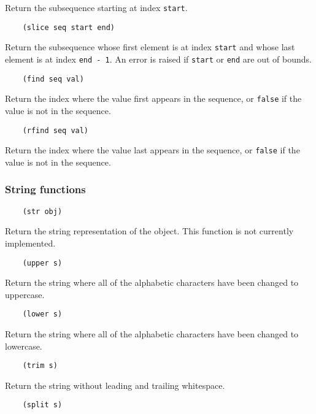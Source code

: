 \documentclass{article}
\newcommand{\inlinecode}{\texttt}
\begin{document}
Return the subsequence starting at index \inlinecode{start}.

\begin{verbatim}
    (slice seq start end)
\end{verbatim}

Return the subsequence whose first element is at index \inlinecode{start} and whose last element is at index \inlinecode{end - 1}. An error is raised if \inlinecode{start} or \inlinecode{end} are out of bounds.

\begin{verbatim}
    (find seq val)
\end{verbatim}

Return the index where the value first appears in the sequence, or \inlinecode{false} if the value is not in the sequence.

\begin{verbatim}
    (rfind seq val)
\end{verbatim}

Return the index where the value last appears in the sequence, or \inlinecode{false} if the value is not in the sequence.

\subsubsection{String functions}
\begin{verbatim}
    (str obj)
\end{verbatim}

Return the string representation of the object. This function is not currently implemented.

\begin{verbatim}
    (upper s)
\end{verbatim}

Return the string where all of the alphabetic characters have been changed to uppercase.

\begin{verbatim}
    (lower s)
\end{verbatim}

Return the string where all of the alphabetic characters have been changed to lowercase.

\begin{verbatim}
    (trim s)
\end{verbatim}

Return the string without leading and trailing whitespace.

\begin{verbatim}
    (split s)
\end{verbatim}
\end{document}

